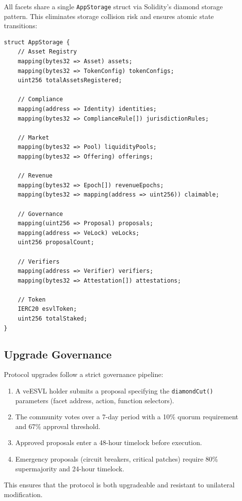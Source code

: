 \documentclass[11pt,a4paper]{article}
\begin{document}
All facets share a single \texttt{AppStorage} struct via Solidity's diamond storage pattern. This eliminates storage collision risk and ensures atomic state transitions:

\begin{lstlisting}[caption={AppStorage struct (simplified)}]
struct AppStorage {
    // Asset Registry
    mapping(bytes32 => Asset) assets;
    mapping(bytes32 => TokenConfig) tokenConfigs;
    uint256 totalAssetsRegistered;

    // Compliance
    mapping(address => Identity) identities;
    mapping(bytes32 => ComplianceRule[]) jurisdictionRules;

    // Market
    mapping(bytes32 => Pool) liquidityPools;
    mapping(bytes32 => Offering) offerings;

    // Revenue
    mapping(bytes32 => Epoch[]) revenueEpochs;
    mapping(bytes32 => mapping(address => uint256)) claimable;

    // Governance
    mapping(uint256 => Proposal) proposals;
    mapping(address => VeLock) veLocks;
    uint256 proposalCount;

    // Verifiers
    mapping(address => Verifier) verifiers;
    mapping(bytes32 => Attestation[]) attestations;

    // Token
    IERC20 esvlToken;
    uint256 totalStaked;
}
\end{lstlisting}

\subsection{Upgrade Governance}

Protocol upgrades follow a strict governance pipeline:

\begin{enumerate}[nosep]
    \item A veESVL holder submits a proposal specifying the \texttt{diamondCut()} parameters (facet address, action, function selectors).
    \item The community votes over a 7-day period with a 10\% quorum requirement and 67\% approval threshold.
    \item Approved proposals enter a 48-hour timelock before execution.
    \item Emergency proposals (circuit breakers, critical patches) require 80\% supermajority and 24-hour timelock.
\end{enumerate}

This ensures that the protocol is both upgradeable and resistant to unilateral modification.
\end{document}
